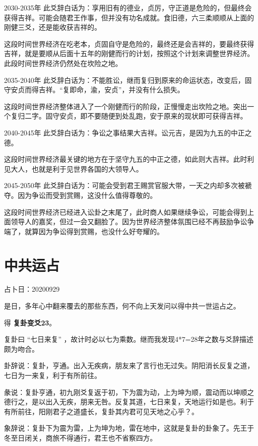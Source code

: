 \documentclass[12pt,oneside]{book}
\begin{document}
2030-2035年 此爻辞白话为：享用旧有的德业，贞厉，守正道是危险的，但最终会获得吉祥。可能会随君王作事，但并没有功名成就。食旧德，六三柔顺顺从上面的刚健三爻，还是能收获吉祥的。

这段时间世界经济在吃老本，贞固自守是危险的，最终还是会吉祥的，要最终获得吉祥，就是要顺从后面十五年的刚健而行的计划，按照这个计划来调整世界经济。此段时间世界经济仍然处在坎险之地。

2035-2040年 此爻辞白话为：不能胜讼，继而复归到原来的命运状态，改变后，固守安贞而得吉祥。“复即命，渝，安贞”，并没有什么损失。

这段时间世界经济整体进入了一个刚健而行的阶段，正慢慢走出坎险之地。突出一个复归二字。固守安贞，即不要随便到处乱跑，安于原来的现状即可获得吉祥。

2040-2045年 此爻辞白话为：争讼之事结果大吉祥。讼元吉，是因为九五的中正之德。

这段时间世界经济最关键的地方在于坚守九五的中正之德，如此则大吉祥。此时利见大人，也就是利于见世界各国的大领导人。

2045-2050年 此爻辞白话为：可能会受到君王赐赏官服大带，一天之内却多次被褫夺。因为争讼而受到赏赐，这没什么值得尊敬的。

这段时间世界经济已经进入讼卦之末尾了，此时商人如果继续争讼，可能会得到上面领导人的嘉奖，但过一会又翻脸了。因为世界经济整体氛围已经不再鼓励争讼争端了，就算因为争讼得到赏赐，也没什么好夸耀的。

\section{中共运占}
占卜日：20200929

是日，多年心中翻来覆去的那些东西，何不向上天发问以得中共一世运占之。

得 \textbf{复卦变爻23}。

复卦曰 “七日来复” ，故计时必以七为乘数。继而我发现4*7=28年之数与爻辞描述颇为吻合。

卦辞说：复卦，亨通。出入无疾病，朋友来了言行也无过失。阴阳消长反复之道，七日为一来复，利于有所前往。

彖说：复卦亨通，初九刚爻复返于初，下为震为动，上为坤为顺，震动而以坤顺之德行之，是以出入无疾，朋来无咎。反复其道，七日来复，天地运行如是也。利于有所前往，阳刚君子之道盛长，复卦其内君可见天地之心乎？。

象辞说：复卦下为震为雷，上为坤为地，雷在地中，这就是复卦的卦象了。先王于冬至日闭关，商旅不得通行，君王也不省察四方。
\end{document}
